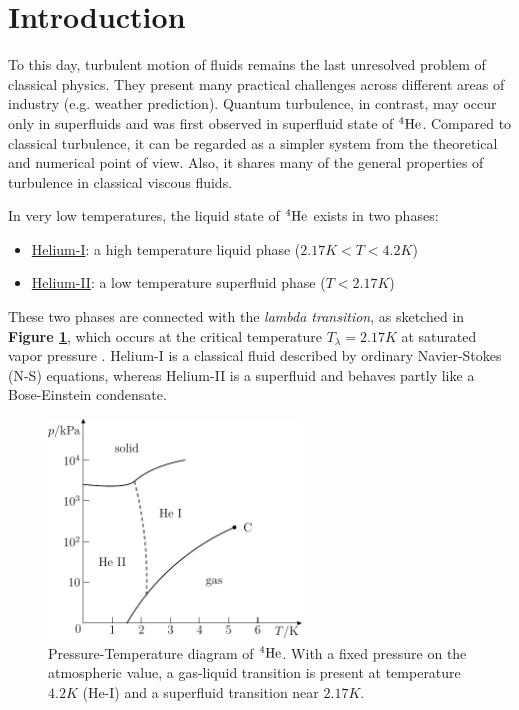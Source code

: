 \chapter*{Introduction}

	To this day, turbulent motion of fluids remains the last unresolved problem of classical physics. They present many practical challenges across different areas of industry (e.g. weather prediction). Quantum turbulence, in contrast, may occur only in superfluids and was first observed in superfluid state of ${}^4\mathrm{He}$. Compared to classical turbulence, it can be regarded as a simpler system from the theoretical and numerical point of view. Also, it shares many of the general properties of turbulence in classical viscous fluids.

	In very low temperatures, the liquid state of ${}^4\mathrm{He}$ exists in two phases:
	\begin{itemize}
		\item \underline{Helium-I}: a high temperature liquid phase ($2.17\unit{K}<T<4.2\unit{K}$)
		\item \underline{Helium-II}: a low temperature superfluid phase ($T<2.17\unit{K}$)
	\end{itemize}

	These two phases are connected with the \textit{lambda transition}, as sketched in \textbf{Figure \ref{phase_diag}}, which occurs at the critical temperature $T_{\lambda} = 2.17 \unit{K}$ at saturated vapor pressure . Helium-I is a classical fluid described by ordinary Navier-Stokes (N-S) equations, whereas Helium-II is a superfluid and behaves partly like a Bose-Einstein condensate.

	\begin{figure}[h]
		\centering
		\includegraphics[width=0.6\textwidth]{graphics/theory/phase_diag}
		\caption{Pressure-Temperature diagram of ${}^4\mathrm{He}$. With a fixed pressure on the atmospheric value, a gas-liquid transition is present at temperature $4.2\unit{K}$ (He-I) and a superfluid transition near $2.17\unit{K}$.}
		\label{phase_diag}
	\end{figure}

